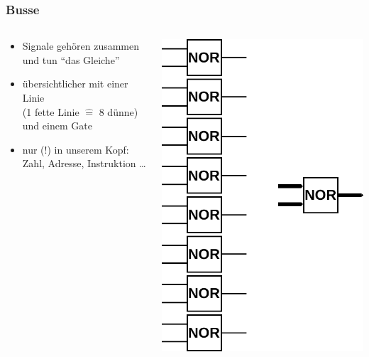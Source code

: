 \documentclass[t,aspectratio=169,usenames,dvipsnames]{beamer}
\begin{document}
\begin{frame}
  \frametitle{Busse}

  \begin{columns}[T]
    \begin{column}{.45\textwidth}
      \begin{itemize}
      \item Signale gehören zusammen und tun \enquote{das Gleiche}
      \item übersichtlicher mit einer Linie\\
        (1 fette Linie $\hat=$ 8 dünne)\\
        und einem Gate
      \item nur (!) in unserem Kopf:\\
        Zahl, Adresse, Instruktion \ldots
      \end{itemize}
    \end{column}

    \begin{column}{.45\textwidth}
      \centering\includegraphics[height=.75\textheight]{nor-bus.pdf}
    \end{column}
  \end{columns}
\end{frame}
\end{document}
